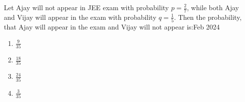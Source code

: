     \item Let Ajay will not appear in JEE exam with probability $p=\frac{2}{7}$, while both Ajay and Vijay will appear in the exam with probability $q=\frac{1}{5}$. Then the probability, that Ajay will appear in the exam and Vijay will not appear is:\hfill{Feb 2024}

        \begin{multicols}{4}
        \begin{enumerate}
        \item $\frac{9}{35}$
        \item $\frac{18}{35}$
        \item $\frac{24}{35}$
        \item $\frac{3}{35}$
        \end{enumerate}
        \end{multicols}
